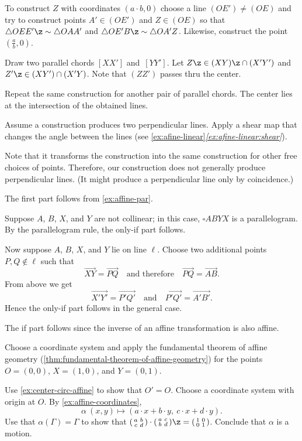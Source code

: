 To construct $Z$ with coordinates $(a\cdot b,0)$
choose a line $(OE')\ne (OE)$
and try to construct points $A'\in (OE')$
and $Z \in(OE)$
so that 
$\triangle OEE'\z\sim \triangle OAA'$ and $\triangle OE'B\z\sim \triangle OA'Z$.
Likewise, construct the point $(\tfrac ab,0)$.

Draw two parallel chords $[XX']$ and~$[YY']$.
Let $Z\z\in(XY)\z\cap (X'Y')$ and $Z'\z\in (XY')\cap (X'Y)$.
Note that $(ZZ')$ passes thru the center.

Repeat the same construction for another pair of parallel chords.
The center lies at the intersection of the obtained lines.

Assume a construction produces two perpendicular lines.
Apply a shear map that changes the angle between the lines (see \ref{ex:afine-linear}\textit{\ref{ex:afine-linear:shear}}).

Note that it transforms the construction into the same construction for other free choices of points.
Therefore, our construction does not generally produce perpendicular lines.
(It might produce a perpendicular line only by coincidence.)
 
The first part follows from \ref{ex:affine-par}.

Suppose $A$, $B$, $X$, and $Y$ are not collinear;
in this case, $\square ABYX$ is a parallelogram.
By the parallelogram rule, the only-if part follows.

Now suppose $A$, $B$, $X$, and $Y$ lie on line $\ell$.
Choose two additional points $P,Q\notin\ell$ such that 
\[\overrightarrow{XY}=\overrightarrow{PQ}
\quad\text{and therefore}\quad 
\overrightarrow{PQ}=\overrightarrow{AB}.\]
From above we get 
\[\overrightarrow{X'Y'}=\overrightarrow{P'Q'}
\quad\text{and}\quad 
\overrightarrow{P'Q'}=\overrightarrow{A'B'}.\]
Hence the only-if part follows in the general case.

The if part follows since the inverse of an affine transformation is also affine.
 
Choose a coordinate system and apply the fundamental theorem of affine geometry (\ref{thm:fundamental-theorem-of-affine-geometry}) for the points $O=(0,0)$, $X=(1,0)$, and $Y=(0,1)$.

Use \ref{ex:center-circ-affine} to show that $O'=O$.
Choose a coordinate system with origin at $O$.
By \ref{ex:affine-coordinates}, 
\[\alpha\:(x,y)\mapsto(a\cdot x+b\cdot y,\ c\cdot x+d\cdot y).\]
Use that $\alpha(\Gamma)=\Gamma$ to show that $(\begin{smallmatrix}a&b\\c&d\end{smallmatrix})\cdot (\begin{smallmatrix}a&c\\b&d\end{smallmatrix})\z=(\begin{smallmatrix}1&0\\0&1\end{smallmatrix})$.
Conclude that $\alpha$ is a motion.

